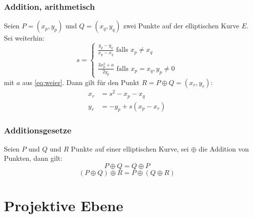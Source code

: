 \documentclass{beamer}
\begin{document}
\begin{frame}
  \frametitle{Addition, arithmetisch}
  \begin{theorem}[Additionsformel]
    Seien $P = (x_p, y_p)$ und $Q=(x_q, y_q)$ zwei Punkte auf der elliptischen
    Kurve $E$. Sei weiterhin:
    \begin{equation*}
      s = \left\{
        \begin{array}{l}
          \frac{y_p - y_q}{x_p - x_q} \text{ falls } x_p \ne x_q \\
          \\
          \frac{3x_p^2 + a}{2y_p}     \text{ falls } x_p = x_q, y_p \ne 0
        \end{array}
        \right.
    \end{equation*}
    mit $a$ aus \eqref{eq:weier}.
    Dann gilt für den Punkt $R = P \oplus Q = (x_r, y_r)$:
    \begin{equation}
      \begin{split}  \label{ec:add}
        x_r & = s^2 - x_p - x_q \\
        y_r & = -y_p + s(x_p - x_r)
      \end{split}
    \end{equation}
  \end{theorem}
\end{frame}

\begin{frame}
  \frametitle{Additionsgesetze}
  Seien $P$ und $Q$ und $R$ Punkte auf einer elliptischen Kurve, sei $\oplus$
  die Addition von Punkten, dann gilt:
  \begin{equation}
    P \oplus Q = Q \oplus P
  \end{equation}
  \begin{equation}
    (P \oplus Q) \oplus R = P \oplus (Q \oplus R)
  \end{equation}
\end{frame}


\section{Projektive Ebene}
\end{document}
